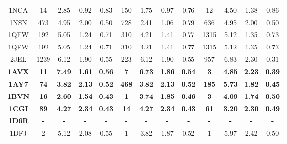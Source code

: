 \begin{longtable}{c c c c c|c c c c|c c c c}
 {\tiny 1NCA} &{\tiny 14}&{\tiny 2.85}&{\tiny 0.92}&{\tiny 0.83} &{\tiny 150}&{\tiny 1.75}&{\tiny 0.97}&{\tiny 0.76} &{\tiny 12}&{\tiny 4.50}&{\tiny 1.38}&{\tiny 0.86}\\ 
 {\tiny 1NSN} &{\tiny 473}&{\tiny 4.95}&{\tiny 2.00}&{\tiny 0.50} &{\tiny 728}&{\tiny 2.41}&{\tiny 1.06}&{\tiny 0.79} &{\tiny 636}&{\tiny 4.95}&{\tiny 2.00}&{\tiny 0.50}\\ 
 {\tiny 1QFW} &{\tiny 192}&{\tiny 5.05}&{\tiny 1.24}&{\tiny 0.71} &{\tiny 310}&{\tiny 4.21}&{\tiny 1.41}&{\tiny 0.77} &{\tiny 1315}&{\tiny 5.12}&{\tiny 1.35}&{\tiny 0.73}\\ 
 {\tiny 1QFW} &{\tiny 192}&{\tiny 5.05}&{\tiny 1.24}&{\tiny 0.71} &{\tiny 310}&{\tiny 4.21}&{\tiny 1.41}&{\tiny 0.77} &{\tiny 1315}&{\tiny 5.12}&{\tiny 1.35}&{\tiny 0.73}\\ 
 {\tiny 2JEL} &{\tiny 1239}&{\tiny 6.12}&{\tiny 1.90}&{\tiny 0.55} &{\tiny 223}&{\tiny 6.12}&{\tiny 1.90}&{\tiny 0.55} &{\tiny 957}&{\tiny 6.83}&{\tiny 2.30}&{\tiny 0.31}\\ 
 \textbf{\tiny 1AVX} &\textbf{\tiny 11}&\textbf{\tiny 7.49}&\textbf{\tiny 1.61}&\textbf{\tiny 0.56} &\textbf{\tiny 7}&\textbf{\tiny 6.73}&\textbf{\tiny 1.86}&\textbf{\tiny 0.54} &\textbf{\tiny 3}&\textbf{\tiny 4.85}&\textbf{\tiny 2.23}&\textbf{\tiny 0.39}\\ 
 \textbf{\tiny 1AY7} &\textbf{\tiny 74}&\textbf{\tiny 3.82}&\textbf{\tiny 2.13}&\textbf{\tiny 0.52} &\textbf{\tiny 468}&\textbf{\tiny 3.82}&\textbf{\tiny 2.13}&\textbf{\tiny 0.52} &\textbf{\tiny 185}&\textbf{\tiny 5.73}&\textbf{\tiny 1.82}&\textbf{\tiny 0.45}\\ 
 \textbf{\tiny 1BVN} &\textbf{\tiny 16}&\textbf{\tiny 2.60}&\textbf{\tiny 1.54}&\textbf{\tiny 0.43} &\textbf{\tiny 1}&\textbf{\tiny 3.74}&\textbf{\tiny 1.85}&\textbf{\tiny 0.46} &\textbf{\tiny 3}&\textbf{\tiny 4.09}&\textbf{\tiny 1.74}&\textbf{\tiny 0.50}\\ 
 \textbf{\tiny 1CGI} &\textbf{\tiny 89}&\textbf{\tiny 4.27}&\textbf{\tiny 2.34}&\textbf{\tiny 0.43} &\textbf{\tiny 14}&\textbf{\tiny 4.27}&\textbf{\tiny 2.34}&\textbf{\tiny 0.43} &\textbf{\tiny 61}&\textbf{\tiny 3.20}&\textbf{\tiny 2.30}&\textbf{\tiny 0.49}\\ 
 \textbf{\tiny 1D6R} &\textbf{\tiny -}&\textbf{\tiny -}&\textbf{\tiny -}&\textbf{\tiny -} &\textbf{\tiny -}&\textbf{\tiny -}&\textbf{\tiny -}&\textbf{\tiny -} &\textbf{\tiny -}&\textbf{\tiny -}&\textbf{\tiny -}&\textbf{\tiny -}\\ 
 {\tiny 1DFJ} &{\tiny 2}&{\tiny 5.12}&{\tiny 2.08}&{\tiny 0.55} &{\tiny 1}&{\tiny 3.82}&{\tiny 1.87}&{\tiny 0.52} &{\tiny 1}&{\tiny 5.97}&{\tiny 2.42}&{\tiny 0.50}\\ 

\end{longtable}
